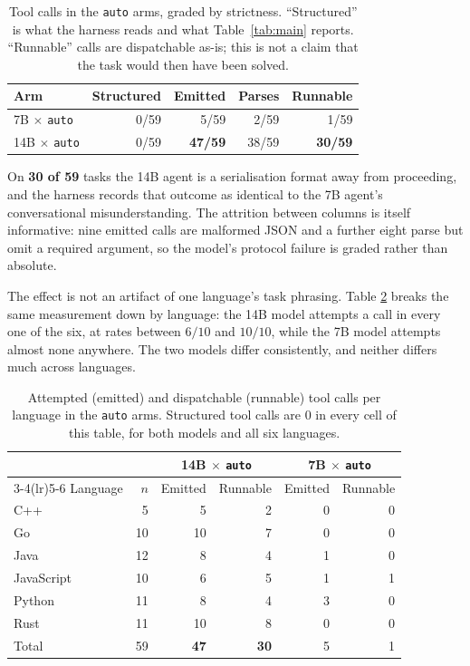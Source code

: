 \documentclass{article}
\begin{document}
\begin{table}[t]
\caption{Tool calls in the \texttt{auto} arms, graded by strictness.
``Structured'' is what the harness reads and what Table~\ref{tab:main}
reports. ``Runnable'' calls are dispatchable as-is; this is not a claim that
the task would then have been solved.}
\label{tab:prose}
\centering
\small
\begin{tabular}{lrrrr}
\toprule
Arm & Structured & Emitted & Parses & Runnable \\
\midrule
7B $\times$ \texttt{auto}  & 0/59 & 5/59  & 2/59  & 1/59 \\
14B $\times$ \texttt{auto} & 0/59 & \textbf{47/59} & 38/59 & \textbf{30/59} \\
\bottomrule
\end{tabular}
\end{table}

On \textbf{30 of 59} tasks the 14B agent is a serialisation format away from
proceeding, and the harness records that outcome as identical to the 7B
agent's conversational misunderstanding. The attrition between columns is
itself informative: nine emitted calls are malformed JSON and a further eight
parse but omit a required argument, so the model's protocol failure is
graded rather than absolute.

The effect is not an artifact of one language's task phrasing. Table
\ref{tab:bylang} breaks the same measurement down by language: the 14B model
attempts a call in every one of the six, at rates between $6/10$ and $10/10$,
while the 7B model attempts almost none anywhere. The two models differ
consistently, and neither differs much across languages.

\begin{table}[t]
\caption{Attempted (emitted) and dispatchable (runnable) tool calls per
language in the \texttt{auto} arms. Structured tool calls are $0$ in every
cell of this table, for both models and all six languages.}
\label{tab:bylang}
\centering
\small
\begin{tabular}{lrrrrr}
\toprule
& & \multicolumn{2}{c}{14B $\times$ \texttt{auto}} & \multicolumn{2}{c}{7B $\times$ \texttt{auto}} \\
\cmidrule(lr){3-4}\cmidrule(lr){5-6}
Language & $n$ & Emitted & Runnable & Emitted & Runnable \\
\midrule
C++        & 5  & 5  & 2 & 0 & 0 \\
Go         & 10 & 10 & 7 & 0 & 0 \\
Java       & 12 & 8  & 4 & 1 & 0 \\
JavaScript & 10 & 6  & 5 & 1 & 1 \\
Python     & 11 & 8  & 4 & 3 & 0 \\
Rust       & 11 & 10 & 8 & 0 & 0 \\
\midrule
Total      & 59 & \textbf{47} & \textbf{30} & 5 & 1 \\
\bottomrule
\end{tabular}
\end{table}
\end{document}
